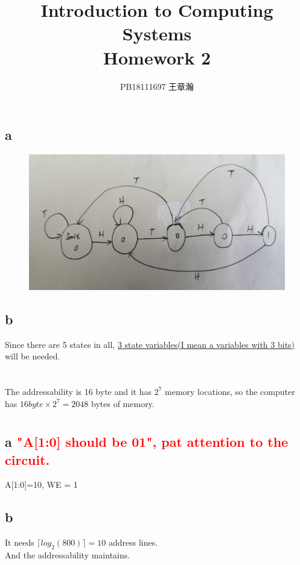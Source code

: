 \documentclass[11pt,a4paper]{article}
\title{Introduction to Computing Systems\\Homework 2}
\author{PB18111697 王章瀚}
\begin{document}
	\maketitle
	\section{}
	\subsection*{a}
	\begin{figure}[H]
		\centering
		\includegraphics[width=1\linewidth]{1_a.jpg}
		\label{1_a}
	\end{figure}
	\subsection*{b}
	Since there are 5 states in all, \underline{3 state variables(I mean a variables with 3 bits)} will be needed.
	
	\section{}
	The addressability is 16 byte and it has $2^{7}$ memory locations, so the computer has \underline{$16byte\times 2^{7}=2048$} bytes of memory.
	
	
	\section{}
	\subsection*{a \textcolor{red}{"A[1:0] should be 01", pat attention to the circuit.}}
	A[1:0]=10, WE = 1
	\subsection*{b}
	It needs $\lceil log_2(800)\rceil=10$ address lines.\\
	And the addressability maintains.
\end{document}
